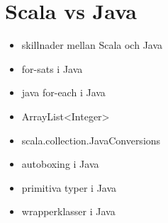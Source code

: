 \chapter{Scala vs Java}
\begin{itemize}[nosep]
\item skillnader mellan Scala och Java
\item for-sats i Java
\item java for-each i Java
\item ArrayList<Integer>
\item scala.collection.JavaConversions
\item autoboxing i Java
\item primitiva typer i Java
\item wrapperklasser i Java\end{itemize}